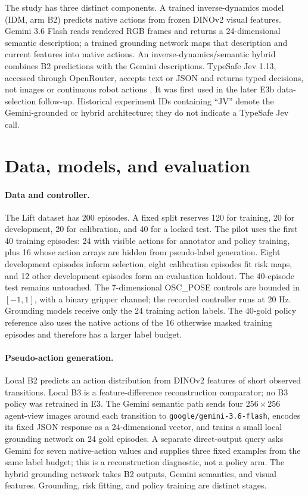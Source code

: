 \documentclass[11pt]{article}
\begin{document}
The study has three distinct components. A trained inverse-dynamics model
(IDM, arm B2) predicts native actions from frozen DINOv2 visual features.
Gemini 3.6 Flash reads rendered RGB frames and returns a 24-dimensional
semantic description; a trained grounding network maps that description and
current features into native actions. An inverse-dynamics/semantic hybrid
combines B2 predictions with the Gemini descriptions. TypeSafe Jev 1.13,
accessed through OpenRouter, accepts text or JSON and returns typed decisions,
not images or continuous robot actions \citep{typesafe,openrouter}. It was
first used in the later E3b data-selection follow-up. Historical experiment
IDs containing ``JV'' denote the Gemini-grounded or hybrid architecture;
they do not indicate a TypeSafe Jev call.

\section{Data, models, and evaluation}
\paragraph{Data and controller.} The Lift dataset has 200 episodes. A fixed
split reserves 120 for training, 20 for development, 20 for calibration, and
40 for a locked test. The pilot uses the first 40 training episodes: 24 with
visible actions for annotator and policy training, plus 16 whose action arrays
are hidden from pseudo-label generation. Eight development episodes inform
selection, eight calibration episodes fit risk maps, and 12 other development
episodes form an evaluation holdout. The 40-episode test remains untouched.
The 7-dimensional OSC\_POSE controls are bounded in $[-1,1]$, with a binary
gripper channel; the recorded controller runs at 20 Hz. Grounding models
receive only the 24 training action labels. The 40-gold policy reference also
uses the native actions of the 16 otherwise masked training episodes and
therefore has a larger label budget.

\paragraph{Pseudo-action generation.} Local B2 predicts an action
distribution from DINOv2 features of short observed transitions. Local B3 is
a feature-difference reconstruction comparator; no B3 policy was retrained
in E3. The Gemini semantic path sends four $256\times256$ agent-view images
around each transition to \texttt{google/gemini-3.6-flash}, encodes its fixed
JSON response as a 24-dimensional vector, and trains a small local grounding
network on 24 gold episodes. A separate direct-output query asks Gemini for
seven native-action values and supplies three fixed examples from the same
label budget; this is a reconstruction diagnostic, not a policy arm. The
hybrid grounding network takes B2 outputs, Gemini semantics, and visual
features. Grounding, risk fitting, and policy training are distinct stages.
\end{document}
